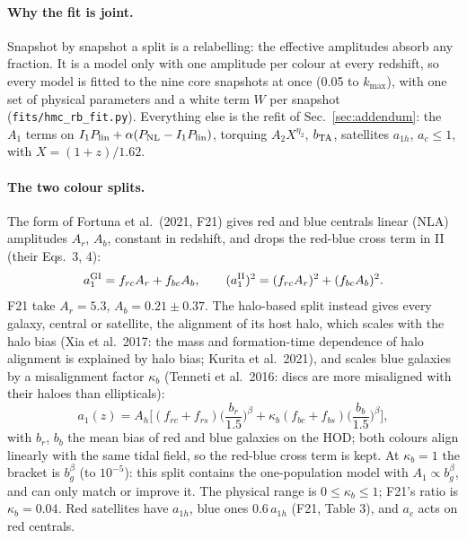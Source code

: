 \documentclass[11pt]{article}
\newcommand{\kmax}{k_{\max}}
\newcommand{\PNL}{P_{\rm NL}}
\newcommand{\Plin}{P_{\rm lin}}
\newcommand{\bTA}{b_{\rm TA}}
\begin{document}
\paragraph{Why the fit is joint.} Snapshot by snapshot a split is a
relabelling: the effective amplitudes absorb any fraction. It is a model only
with one amplitude per colour at every redshift, so every model is fitted to
the nine core snapshots at once (0.05 to $\kmax$), with one set of physical
parameters and a white term $W$ per snapshot (\texttt{fits/hmc\_rb\_fit.py}).
Everything else is the refit of Sec.~\ref{sec:addendum}: the $A_1$ terms on
$I_1\Plin + \alpha(\PNL - I_1\Plin)$, torquing $A_2X^{\eta_2}$, $\bTA$,
satellites $a_{1h}$, $a_c \le 1$, with $X = (1+z)/1.62$.

\paragraph{The two colour splits.} The form of Fortuna et al.\ (2021, F21)
gives red and blue centrals linear (NLA) amplitudes $A_r$, $A_b$, constant in
redshift, and drops the red-blue cross term in II (their Eqs.~3, 4):
\begin{equation}
a_1^{\rm GI} = f_{rc}A_r + f_{bc}A_b,\qquad
(a_1^{\rm II})^2 = (f_{rc}A_r)^2 + (f_{bc}A_b)^2 .
\label{eq:f21rb}
\end{equation}
F21 take $A_r = 5.3$, $A_b = 0.21 \pm 0.37$. The halo-based split instead
gives every galaxy, central or satellite, the alignment of its host halo,
which scales with the halo bias (Xia et al.\ 2017: the mass and
formation-time dependence of halo alignment is explained by halo bias;
Kurita et al.\ 2021), and scales blue galaxies by a misalignment factor
$\kappa_b$ (Tenneti et al.\ 2016: discs are more misaligned with their haloes
than ellipticals):
\begin{equation}
a_1(z) = A_h\Big[(f_{rc} + f_{rs})\Big(\frac{b_r}{1.5}\Big)^{\beta}
 + \kappa_b(f_{bc} + f_{bs})\Big(\frac{b_b}{1.5}\Big)^{\beta}\Big],
\label{eq:rbS}
\end{equation}
with $b_r$, $b_b$ the mean bias of red and blue galaxies on the HOD; both
colours align linearly with the same tidal field, so the red-blue cross term
is kept. At $\kappa_b = 1$ the bracket is $b_g^\beta$ (to $10^{-5}$): this
split contains the one-population model with $A_1 \propto b_g^\beta$, and can
only match or improve it. The physical range is $0 \le \kappa_b \le 1$; F21's
ratio is $\kappa_b = 0.04$. Red satellites have $a_{1h}$, blue ones
$0.6\,a_{1h}$ (F21, Table 3), and $a_c$ acts on red centrals.
\end{document}
